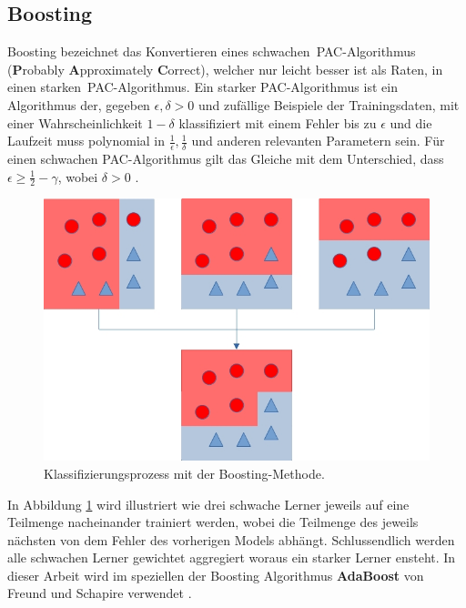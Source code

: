 \subsection{Boosting}
Boosting bezeichnet das Konvertieren eines \glqq schwachen\grqq\ PAC-Algorithmus (\textbf{P}robably \textbf{A}pproximately \textbf{C}orrect), welcher nur leicht besser ist als Raten, in einen \glqq starken\grqq\
PAC-Algorithmus. Ein starker PAC-Algorithmus ist ein Algorithmus der, gegeben $\epsilon, \delta > 0$ und zufällige Beispiele der Trainingsdaten, mit einer Wahrscheinlichkeit $1 - \delta$
klassifiziert mit einem Fehler bis zu $\epsilon$ und die Laufzeit muss polynomial in $\frac{1}{\epsilon}, \frac{1}{\delta}$ und anderen relevanten Parametern sein. Für einen schwachen PAC-Algorithmus gilt das Gleiche
mit dem Unterschied, dass $\epsilon \geq \frac{1}{2} - \gamma$, wobei $\delta > 0$ \cite{freund1997decision}.
\newline
\newline
\begin{figure}
    \centering
    \includegraphics[width=0.6\linewidth]{images/boosting.jpg}
    \caption{Klassifizierungsprozess mit der Boosting-Methode.}
    \label{fig:boosting}
\end{figure}
In Abbildung \ref{fig:boosting} wird illustriert wie drei schwache Lerner jeweils auf eine Teilmenge nacheinander trainiert werden, wobei die Teilmenge des jeweils nächsten von dem Fehler des vorherigen Models abhängt.
Schlussendlich werden alle schwachen Lerner gewichtet aggregiert woraus ein starker Lerner ensteht. In dieser Arbeit wird im speziellen der Boosting Algorithmus \textbf{AdaBoost} von Freund und Schapire verwendet \cite{freund1997decision}.